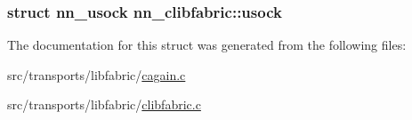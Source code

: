 \subsubsection[{usock}]{\setlength{\rightskip}{0pt plus 5cm}struct {\bf nn\+\_\+usock} nn\+\_\+clibfabric\+::usock}\hypertarget{structnn__clibfabric_a8ca82c30329e862f0aa321878951d601}{}\label{structnn__clibfabric_a8ca82c30329e862f0aa321878951d601}


The documentation for this struct was generated from the following files\+:\begin{DoxyCompactItemize}
\item 
src/transports/libfabric/\hyperlink{cagain_8c}{cagain.\+c}\item 
src/transports/libfabric/\hyperlink{clibfabric_8c}{clibfabric.\+c}\end{DoxyCompactItemize}
